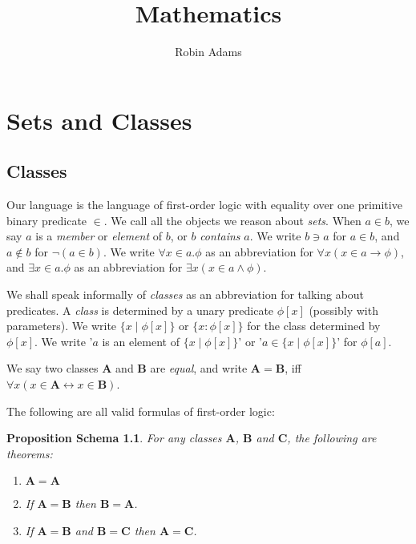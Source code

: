 \documentclass{book}
\title{Mathematics}
\author{Robin Adams}
\newtheorem{props}[ax]{Proposition Schema}
\theoremstyle{definition}
\begin{document}
\maketitle

\chapter{Sets and Classes}

\section{Classes}

Our language is the language of first-order logic with equality over one primitive binary predicate $\in$. We call all the objects we reason about \emph{sets}. When $a \in b$, we say $a$ is a \emph{member} or \emph{element} of $b$, or $b$ \emph{contains} $a$. We write $b \ni a$ for $a \in b$, and $a \notin b$ for $\neg(a \in b)$. We write $\forall x \in a. \phi$ as an abbreviation for $\forall x(x \in a \rightarrow \phi)$, and $\exists x \in a. \phi$ as an abbreviation for $\exists x(x \in a \wedge \phi)$.

We shall speak informally of \emph{classes} as an abbreviation for talking about predicates. A \emph{class} is determined by a unary predicate $\phi[x]$ (possibly with parameters). We write $\{ x \mid \phi[x] \}$ or $\{ x : \phi[x] \}$ for the class determined by $\phi[x]$. We write '$a$ is an element of $\{x \mid \phi[x]\}$' or '$a \in \{x \mid \phi[x]\}$' for $\phi[a]$.

We say two classes $\mathbf{A}$ and $\mathbf{B}$ are \emph{equal}, and write $\mathbf{A} = \mathbf{B}$, iff $\forall x (x \in \mathbf{A} \leftrightarrow x \in \mathbf{B})$.

The following are all valid formulas of first-order logic:

\begin{props}
For any classes $\mathbf{A}$, $\mathbf{B}$ and $\mathbf{C}$, the following are theorems:
\begin{enumerate}
\item $\mathbf{A} = \mathbf{A}$
\item If $\mathbf{A} = \mathbf{B}$ then $\mathbf{B} = \mathbf{A}$.
\item If $\mathbf{A} = \mathbf{B}$ and $\mathbf{B} = \mathbf{C}$ then $\mathbf{A} = \mathbf{C}$.
\end{enumerate}
\end{props}
\end{document}
